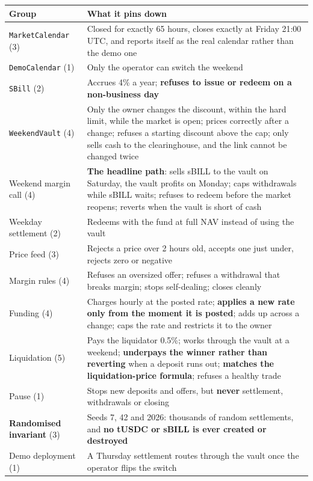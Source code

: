\documentclass[11pt,a4paper]{article}
\begin{document}
\begin{center}
\small
\begin{tabular}{@{}p{5.4cm}p{10.0cm}@{}}
\toprule
\textbf{Group} & \textbf{What it pins down} \\
\midrule
\texttt{MarketCalendar} (3) & Closed for exactly 65 hours, closes exactly at Friday 21:00 UTC, and reports itself as the real calendar rather than the demo one \\
\texttt{DemoCalendar} (1) & Only the operator can switch the weekend \\
\texttt{SBill} (2) & Accrues 4\% a year; \textbf{refuses to issue or redeem on a non-business day} \\
\texttt{WeekendVault} (4) & Only the owner changes the discount, within the hard limit, while the market is open; prices correctly after a change; refuses a starting discount above the cap; only sells cash to the clearinghouse, and the link cannot be changed twice \\
Weekend margin call (4) & \textbf{The headline path}: sells sBILL to the vault on Saturday, the vault profits on Monday; caps withdrawals while sBILL waits; refuses to redeem before the market reopens; reverts when the vault is short of cash \\
Weekday settlement (2) & Redeems with the fund at full NAV instead of using the vault \\
Price feed (3) & Rejects a price over 2 hours old, accepts one just under, rejects zero or negative \\
Margin rules (4) & Refuses an oversized offer; refuses a withdrawal that breaks margin; stops self-dealing; closes cleanly \\
Funding (4) & Charges hourly at the posted rate; \textbf{applies a new rate only from the moment it is posted}; adds up across a change; caps the rate and restricts it to the owner \\
Liquidation (5) & Pays the liquidator 0.5\%; works through the vault at a weekend; \textbf{underpays the winner rather than reverting} when a deposit runs out; \textbf{matches the liquidation-price formula}; refuses a healthy trade \\
Pause (1) & Stops new deposits and offers, but \textbf{never} settlement, withdrawals or closing \\
\textbf{Randomised invariant} (3) & Seeds 7, 42 and 2026: thousands of random settlements, and \textbf{no tUSDC or sBILL is ever created or destroyed} \\
Demo deployment (1) & A Thursday settlement routes through the vault once the operator flips the switch \\
\bottomrule
\end{tabular}
\end{center}
\end{document}
